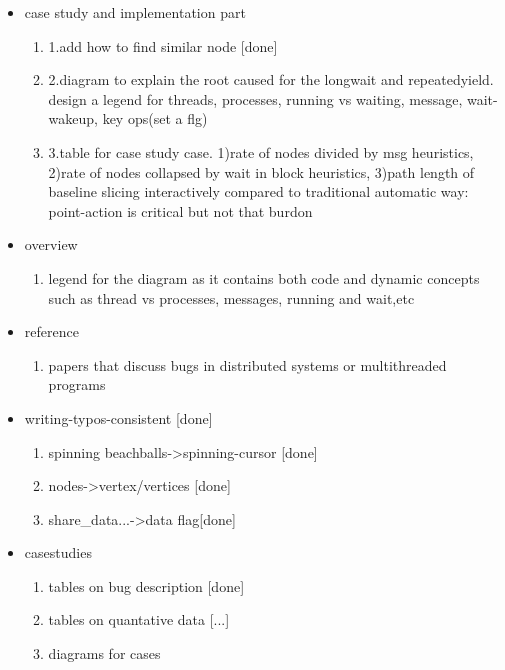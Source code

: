 \begin{itemize}

\item case study and implementation part
	\begin{enumerate}
 	\item 1.add how to find similar node [done]
 	\item 2.diagram to explain the root caused for the longwait and repeatedyield. design a legend for threads, processes, running vs waiting, message, wait-wakeup, key ops(set a flg)
	\item 3.table for case study case. 
		1)rate of nodes divided by msg heuristics,
		2)rate of nodes collapsed by wait in block heuristics,
		3)path length of baseline slicing interactively compared to traditional automatic way: point-action is critical but not that burdon

	\end{enumerate}
\item overview
	\begin{enumerate}
	\item legend for the diagram as it contains both code and dynamic concepts such as thread vs processes, messages, running and wait,etc
	\end{enumerate}

\item reference
	\begin{enumerate}
	\item papers that discuss bugs in distributed systems or multithreaded programs
	\end{enumerate}

\item writing-typos-consistent [done]
	\begin{enumerate}
	\time command, variable names, etc should have \vv
	\item spinning beachballs->spinning-cursor [done]
	\item nodes->vertex/vertices [done]
	\item share\_data...->data flag[done]
	\end{enumerate}

\item casestudies
	\begin{enumerate}
	\item tables on bug description [done]
	\item tables on quantative data [...]
	\item diagrams for cases
	\end{enumerate}

\end{itemize}
